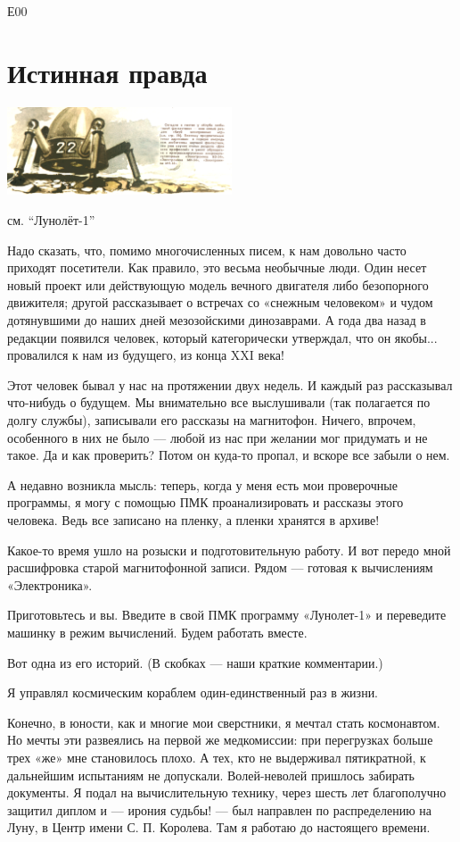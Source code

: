 \documentclass[11pt,a4paper,oneside]{article}
\begin{document}
Е00

\section{Истинная правда}
\label{truth}
\includegraphics[width=0.5\textwidth]{real_truth}

см. ``Лунолёт-1''

Надо сказать, что, помимо многочисленных писем, к нам довольно часто приходят посетители. Как правило, это весьма необычные люди. Один несет новый проект или действующую модель вечного двигателя либо безопорного движителя; другой рассказывает о встречах со «снежным человеком» и чудом дотянувшими до наших дней мезозойскими динозаврами. А года два назад в редакции появился человек, который категорически утверждал, что он якобы... провалился к нам из будущего, из конца XXI века!

Этот человек бывал у нас на протяжении двух недель. И каждый раз рассказывал что-нибудь о будущем. Мы внимательно все выслушивали (так полагается по долгу службы), записывали его рассказы на магнитофон. Ничего, впрочем, особенного в них не было — любой из нас при желании мог придумать и не такое. Да и как проверить? Потом он куда-то пропал, и вскоре все забыли о нем.

А недавно возникла мысль: теперь, когда у меня есть мои проверочные программы, я могу с помощью ПМК проанализировать и рассказы этого человека. Ведь все записано на пленку, а пленки хранятся в архиве!

Какое-то время ушло на розыски и подготовительную работу. И вот передо мной расшифровка старой магнитофонной записи. Рядом — готовая к вычислениям «Электроника».

Приготовьтесь и вы. Введите в свой ПМК программу «Лунолет-1» и переведите машинку в режим вычислений. Будем работать вместе.

Вот одна из его историй. (В скобках — наши краткие комментарии.)

Я управлял космическим кораблем один-единственный раз в жизни.

Конечно, в юности, как и многие мои сверстники, я мечтал стать космонавтом. Но мечты эти развеялись на первой же медкомиссии: при перегрузках больше трех «же» мне становилось плохо. А тех, кто не выдерживал пятикратной, к дальнейшим испытаниям не допускали. Волей-неволей пришлось забирать документы. Я подал на вычислительную технику, через шесть лет благополучно защитил диплом и — ирония судьбы! — был направлен по распределению на Луну, в Центр имени С. П. Королева. Там я работаю до настоящего времени.
\end{document}
